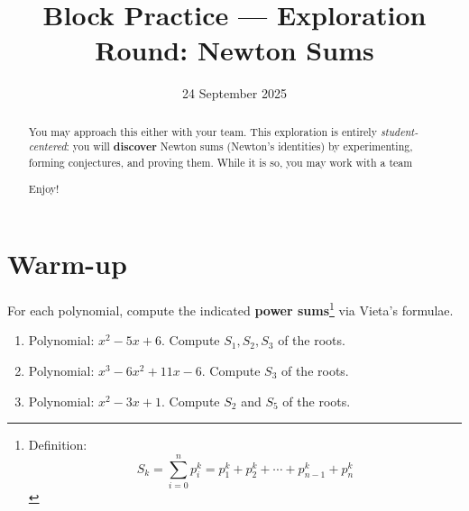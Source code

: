 \documentclass{tufte-handout}
\title{Block Practice — Exploration Round: Newton Sums}
\author[IA Math Team]{}
\date{24 September 2025}
\newcommand{\nn}[1]{\vspace{#1}\noindent}
\begin{document}
\maketitle

\begin{abstract}
You may approach this either with your team.
This exploration is entirely \emph{student-centered}: you will \textbf{discover} Newton sums (Newton's identities) by experimenting, forming conjectures, and proving them. While it is so, you may work with a team 

\nn{1em}Enjoy!

\end{abstract}




\section*{Warm-up}
For each polynomial, compute the indicated \textbf{power sums}\footnote{Definition: \[S_k=\sum_{i=0}^np_i^k=p_1^k+p_2^k+\cdots+p_{n-1}^k+p_n^k\]} via Vieta's formulae. 

\vspace{1em}
\begin{enumerate}[label=\textbf{W\arabic*.}, leftmargin=*, itemsep=2em]
  \item Polynomial: $x^2-5x+6$. Compute $S_1, S_2, S_3$ of the roots.
  \item Polynomial: $x^3-6x^2+11x-6$. Compute $S_3$ of the roots.
  \item Polynomial: $x^2-3x+1$. Compute $S_2$ and $S_5$ of the roots.
\end{enumerate}

\vspace{2em}
\end{document}
